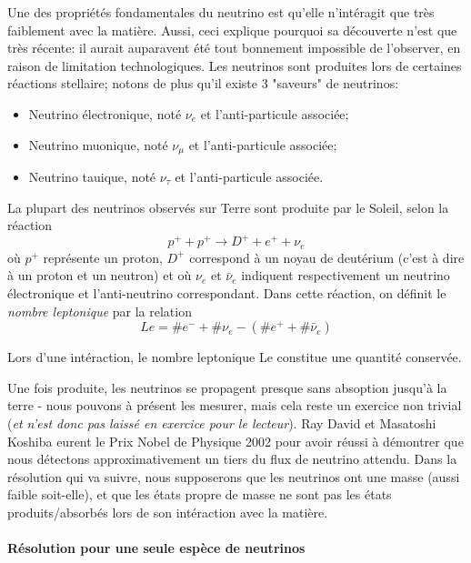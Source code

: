 \documentclass[../notesdecours.tex]{subfiles}
\begin{document}
Une des propriétés fondamentales du neutrino est qu'elle n'intéragit que très faiblement avec la matière. Aussi, ceci explique pourquoi sa découverte n'est que très récente: il aurait auparavent été tout bonnement impossible de l'observer, en raison de limitation technologiques. Les neutrinos sont produites lors de certaines réactions stellaire; notons de plus qu'il existe 3 "saveurs" de neutrinos:
\begin{itemize}
    \item Neutrino électronique, noté $\nu_e$ et l'anti-particule associée;
    \item Neutrino muonique, noté $\nu_\mu$ et l'anti-particule associée;
    \item Neutrino tauique, noté $\nu_\tau$ et l'anti-particule associée.
\end{itemize}
La plupart des neutrinos observés sur Terre sont produite par le Soleil, selon la réaction
\begin{equation}\label{eq:reaction neutrino}
    p^+ + p^+ \longrightarrow D^+ + e^+ + \nu_e
\end{equation}
où $p^+$ représente un proton, $D^+$ correspond à \color{purple} un noyau de deutérium (c'est à dire à un proton et un neutron) \color{black}et où $\nu_e$ et $\bar{\nu}_e$ indiquent respectivement un neutrino électronique et l'anti-neutrino correspondant. Dans cette réaction, on définit le \textit{nombre leptonique} par la relation
\begin{equation}
    Le = \#e^- + \#\nu_e - (\#e^++\#\bar{\nu}_e)
\end{equation}
\begin{Property}
    Lors d'une intéraction, le nombre leptonique Le constitue une quantité conservée.
\end{Property}

Une fois produite, les neutrinos se propagent presque sans absoption jusqu'à la terre - nous pouvons à présent les mesurer, mais cela reste un exercice non trivial (\textit{et n'est donc pas laissé en exercice pour le lecteur}). \color{purple} Ray David et Masatoshi Koshiba eurent le Prix Nobel de Physique 2002 pour avoir réussi à démontrer que nous détectons approximativement un tiers du flux de neutrino attendu. \color{black}Dans la résolution qui va suivre, nous supposerons que les neutrinos ont une masse (aussi faible soit-elle), et que les états propre de masse ne sont pas les états produits/absorbés lors de son intéraction avec la matière.

\paragraph{Résolution pour une seule espèce de neutrinos}
\end{document}
